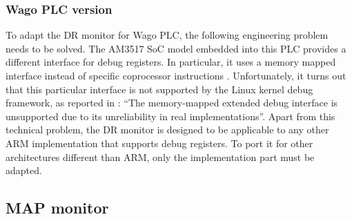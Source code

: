 \subsubsection{Wago PLC version}

To adapt the DR monitor for Wago PLC, the following engineering problem needs to be solved.
The AM3517 SoC model embedded into this PLC provides a different interface for debug registers. In particular, it uses a memory mapped interface
instead of specific coprocessor instructions \cite{am35x}.
Unfortunately, it turns out that this particular interface is not supported by the Linux kernel debug framework, as reported in \cite{dr-mapped}:
``The memory-mapped extended debug interface is unsupported due to its unreliability in real implementations''.
Apart from this technical problem, the DR monitor is designed to be applicable to any other ARM implementation that supports debug registers.
To port it for other architectures different than ARM, only the implementation part must be adapted.


\subsection{MAP monitor}

